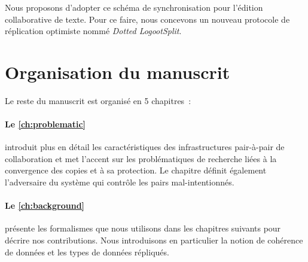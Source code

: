 Nous proposons d'adopter ce schéma de synchronisation pour l'édition collaborative de texte.
Pour ce faire, nous concevons un nouveau protocole de réplication optimiste nommé \emph{Dotted LogootSplit}.


\section{Organisation du manuscrit}

Le reste du manuscrit est organisé en 5 chapitres~:

\paragraph{Le \autoref{ch:problematic}} introduit plus en détail les caractéristiques des infrastructures pair-à-pair de collaboration et met l'accent sur les problématiques de recherche liées à la convergence des copies et à sa protection. Le chapitre définit également l'adversaire du système qui contrôle les pairs mal-intentionnés.

\paragraph{Le \autoref{ch:background}} présente les formalismes que nous utilisons dans les chapitres suivants pour décrire nos contributions.
Nous introduisons en particulier la notion de cohérence de données et les types de données répliqués.



